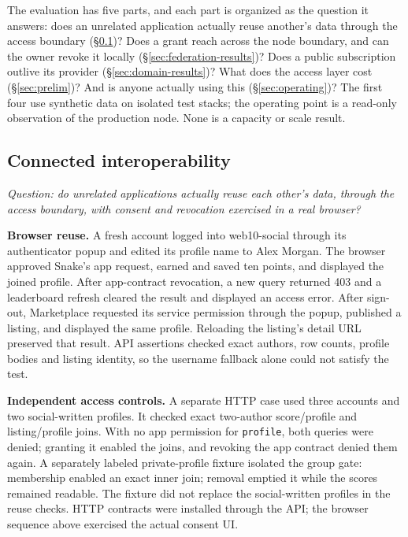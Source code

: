 \documentclass[sigconf, nonacm]{acmart}
\begin{document}
The evaluation has five parts, and each part is organized as the question it
answers: does an unrelated application actually reuse another's data through
the access boundary (\S\ref{sec:interop-results})? Does a grant reach across
the node boundary, and can the owner revoke it locally
(\S\ref{sec:federation-results})? Does a public subscription outlive its
provider (\S\ref{sec:domain-results})? What does the access layer cost
(\S\ref{sec:prelim})? And is anyone actually using this
(\S\ref{sec:operating})? The first four use synthetic data on isolated test
stacks; the operating point is a read-only observation of the production
node. None is a capacity or scale result.

\subsection{Connected interoperability}
\label{sec:interop-results}

\emph{Question: do unrelated applications actually reuse each other's data,
through the access boundary, with consent and revocation exercised in a real
browser?}

\textbf{Browser reuse.} A fresh account logged into web10-social through its
authenticator popup and edited its profile name to Alex Morgan. The browser
approved Snake's app request, earned and saved ten points, and displayed the
joined profile. After app-contract revocation, a new query returned 403 and a
leaderboard refresh cleared the result and displayed an access error. After
sign-out, Marketplace requested its service permission through the popup,
published a listing, and displayed the same profile. Reloading the listing's
detail URL preserved that result. API assertions checked exact authors, row
counts, profile bodies and listing identity, so the username fallback alone
could not satisfy the test.

\textbf{Independent access controls.} A separate HTTP case used three
accounts and two social-written profiles. It checked exact two-author
score/profile and listing/profile joins. With no app permission for
\texttt{profile}, both queries were denied; granting it enabled the joins,
and revoking the app contract denied them again. A separately labeled
private-profile fixture isolated the group gate: membership enabled an exact
inner join; removal emptied it while the scores remained readable. The fixture
did not replace the social-written profiles in the reuse checks. HTTP
contracts were installed through the API; the browser sequence above
exercised the actual consent UI.
\end{document}

